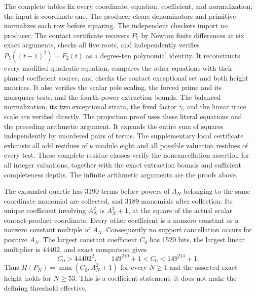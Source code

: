 \documentclass[11pt,a4paper]{article}
\begin{document}
The complete tables fix every coordinate, equation, coefficient, and
normalization; the input is coordinate one. The producer clears
denominators and primitive-normalizes each row before squaring.
The independent checkers import no producer. The contact certificate recovers $P_5$ by
Newton finite differences at six exact arguments, checks all five roots,
and independently verifies $P_5((t-1)^2)=F_2(t)$ as a degree-ten
polynomial identity. It reconstructs every modified quadratic equation,
compares the other equations with their pinned coefficient source, and
checks the contact exceptional set and both height matrices. It also verifies the scalar pole scaling, the forced prime and its nonsquare tests, and the fourth-power extraction bounds.
The balanced normalization, its two exceptional strata, the fixed factor $\gamma$, and the linear trace scale are verified directly.
The projection proof uses these literal equations and the preceding
arithmetic argument.
It expands the entire sum of squares independently by unordered
pairs of terms. The supplementary local certificate exhausts all
odd residues of $\nu$ modulo eight and all possible valuation residues
of every test. These complete residue classes verify the
noncancellation assertion for all integer valuations, together with
the exact extraction bounds and sufficient completeness depths.
The infinite arithmetic arguments are the proofs above.

The expanded quartic has 3190 terms before powers of $A_N$ belonging
to the same coordinate monomial are collected, and 3189 monomials
after collection. Its unique coefficient involving $A_N^2$ is
$A_N^2+1$, at the square of the actual scalar contact-product coordinate.
Every other coefficient is a nonzero constant or a nonzero constant
multiple of $A_N$. Consequently no support cancellation occurs for
positive $A_N$. The largest constant coefficient $C_0$ has 1520 bits,
the largest linear multiplier is $44402$, and exact comparison
gives
\[
 C_0>44402^2,\qquad
 149^{210}+1<C_0<149^{214}+1.
\]
Thus $H(P_N)=\max(C_0,A_N^2+1)$ for every $N\ge1$ and the asserted
exact height holds for $N\ge53$. This is a coefficient statement;
it does not make the defining threshold effective.
\end{document}
